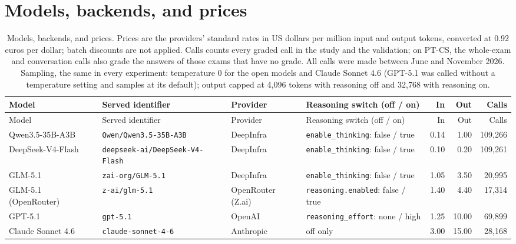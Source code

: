 \documentclass[10pt]{article}
\begin{document}
\section{Models, backends, and prices}
\begingroup\footnotesize
\begin{longtable}{>{\raggedright\arraybackslash}p{2.6cm}>{\raggedright\arraybackslash}p{3.3cm}>{\raggedright\arraybackslash}p{1.9cm}>{\raggedright\arraybackslash}p{3.6cm}rrr}
\caption{Models, backends, and prices. Prices are the providers' standard rates in US dollars per million input and output tokens, converted at 0.92 euros per dollar; batch discounts are not applied. Calls counts every graded call in the study and the validation; on PT-CS, the whole-exam and conversation calls also grade the answers of those exams that have no grade. All calls were made between June and November 2026. Sampling, the same in every experiment: temperature 0 for the open models and Claude Sonnet 4.6 (GPT-5.1 was called without a temperature setting and samples at its default); output capped at 4,096 tokens with reasoning off and 32,768 with reasoning on.}\\
\hline
Model & Served identifier & Provider & Reasoning switch (off / on) & In & Out & Calls \\ \hline
\endfirsthead
\hline
Model & Served identifier & Provider & Reasoning switch (off / on) & In & Out & Calls \\ \hline
\endhead
Qwen3.5-35B-A3B & \texttt{Qwen/\allowbreak{}Qwen3.5-35B-A3B} & DeepInfra & \texttt{enable\_thinking}: false / true & 0.14 & 1.00 & 109,266 \\
DeepSeek-V4-Flash & \texttt{deepseek-ai/\allowbreak{}DeepSeek-V4-Flash} & DeepInfra & \texttt{enable\_thinking}: false / true & 0.10 & 0.20 & 109,261 \\
GLM-5.1 & \texttt{zai-org/\allowbreak{}GLM-5.1} & DeepInfra & \texttt{enable\_thinking}: false / true & 1.05 & 3.50 & 20,995 \\
GLM-5.1 (OpenRouter) & \texttt{z-ai/\allowbreak{}glm-5.1} & OpenRouter (Z.ai) & \texttt{reasoning.enabled}: false / true & 1.40 & 4.40 & 17,314 \\
GPT-5.1 & \texttt{gpt-5.1} & OpenAI & \texttt{reasoning\_effort}: none / high & 1.25 & 10.00 & 69,899 \\
Claude Sonnet 4.6 & \texttt{claude-sonnet-4-6} & Anthropic & off only & 3.00 & 15.00 & 28,168 \\
\hline
\end{longtable}
\endgroup
\end{document}
